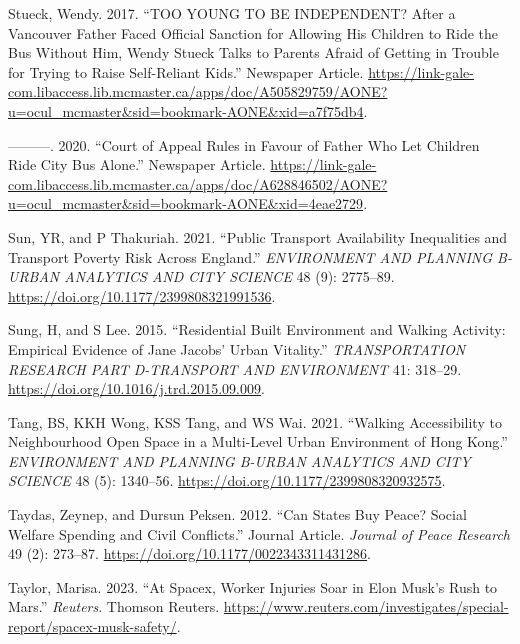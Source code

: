 \documentclass[12pt, oneside]{report}
\newlength{\cslhangindent}
\newlength{\cslentryspacingunit} %
\newenvironment{CSLReferences}[2] %
 {%
  \setlength{\parindent}{0pt}
  \ifodd #1
  \let\oldpar\par
  \def\par{\hangindent=\cslhangindent\oldpar}
  \fi
  \setlength{\parskip}{#2\cslentryspacingunit}
 }%
 {}
\begin{document}
\begin{CSLReferences}{1}{0}
\leavevmode{}%
Stueck, Wendy. 2017. {``TOO YOUNG TO BE INDEPENDENT? After a Vancouver
Father Faced Official Sanction for Allowing His Children to Ride the Bus
Without Him, Wendy Stueck Talks to Parents Afraid of Getting in Trouble
for Trying to Raise Self-Reliant Kids.''} Newspaper Article.
\url{https://link-gale-com.libaccess.lib.mcmaster.ca/apps/doc/A505829759/AONE?u=ocul_mcmaster\&sid=bookmark-AONE\&xid=a7f75db4}.

\leavevmode{}%
---------. 2020. {``Court of Appeal Rules in Favour of Father Who Let
Children Ride City Bus Alone.''} Newspaper Article.
\url{https://link-gale-com.libaccess.lib.mcmaster.ca/apps/doc/A628846502/AONE?u=ocul_mcmaster\&sid=bookmark-AONE\&xid=4eae2729}.

\leavevmode{}%
Sun, YR, and P Thakuriah. 2021. {``Public Transport Availability
Inequalities and Transport Poverty Risk Across {England}.''}
\emph{ENVIRONMENT AND PLANNING B-URBAN ANALYTICS AND CITY SCIENCE} 48
(9): 2775--89. \url{https://doi.org/10.1177/2399808321991536}.

\leavevmode{}%
Sung, H, and S Lee. 2015. {``Residential Built Environment and Walking
Activity: {Empirical} Evidence of {Jane Jacobs}' Urban Vitality.''}
\emph{TRANSPORTATION RESEARCH PART D-TRANSPORT AND ENVIRONMENT} 41:
318--29. \url{https://doi.org/10.1016/j.trd.2015.09.009}.

\leavevmode{}%
Tang, BS, KKH Wong, KSS Tang, and WS Wai. 2021. {``Walking Accessibility
to Neighbourhood Open Space in a Multi-Level Urban Environment of {Hong
Kong}.''} \emph{ENVIRONMENT AND PLANNING B-URBAN ANALYTICS AND CITY
SCIENCE} 48 (5): 1340--56.
\url{https://doi.org/10.1177/2399808320932575}.

\leavevmode{}%
Taydas, Zeynep, and Dursun Peksen. 2012. {``Can States Buy Peace? Social
Welfare Spending and Civil Conflicts.''} Journal Article. \emph{Journal
of Peace Research} 49 (2): 273--87.
\url{https://doi.org/10.1177/0022343311431286}.

\leavevmode{}%
Taylor, Marisa. 2023. {``At Spacex, Worker Injuries Soar in Elon Musk's
Rush to Mars.''} \emph{Reuters}. Thomson Reuters.
\url{https://www.reuters.com/investigates/special-report/spacex-musk-safety/}.


\end{CSLReferences}
\end{document}
